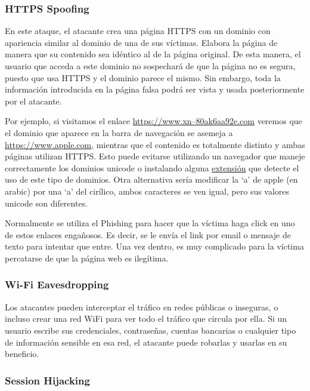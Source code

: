 \documentclass[11pt]{article}
\begin{document}
 \subsubsection*{HTTPS Spoofing}
 
 En este ataque, el atacante crea una página HTTPS con un dominio con apariencia similar al dominio de una de sus víctimas. Elabora la página de manera que su contenido sea idéntico al de la página original. De esta manera, el usuario que acceda a este dominio no sospechará de que la página no es segura, puesto que usa HTTPS y el dominio parece el mismo. Sin embargo, toda la información introducida en la página falsa podrá ser vista y usada posteriormente por el atacante.
 
 Por ejemplo, si visitamos el enlace \href{https://www.xn--80ak6aa92e.com}{https://www.xn--80ak6aa92e.com} veremos que el dominio que aparece en la
  barra de navegación se asemeja a \href{https://www.apple.com}{https://www.apple.com}, mientras que el contenido es totalmente distinto y ambas páginas
   utilizan HTTPS. Esto puede evitarse utilizando un navegador que maneje correctamente los dominios unicode o instalando alguna
  \href{https://github.com/yabirgb/punycodeAlert}{extensión} que detecte
 el uso de este tipo de dominios. Otra alternativa sería modificar la `a' de apple (en arabic) por una `a' del cirílico, ambos caracteres se ven
 igual, pero sus valores unicode son diferentes.
 
 Normalmente se utiliza el Phishing para hacer que la víctima haga click en uno de estos enlaces engañosos. Es decir, se le envía el link por email o mensaje de texto para intentar que entre. Una vez dentro, es muy complicado para la víctima percatarse de que la página web es ilegítima.
 
 \subsubsection*{Wi-Fi Eavesdropping}
 
 Los atacantes pueden interceptar el tráfico en redes públicas o inseguras, o incluso crear una red WiFi para ver todo el tráfico que circula por ella. Si un usuario escribe sus credenciales, contraseñas, cuentas bancarias o cualquier tipo de información sensible en esa red, el atacante puede robarlas y usarlas en su beneficio.
 
 \subsubsection*{Session Hijacking}
 
\end{document}
